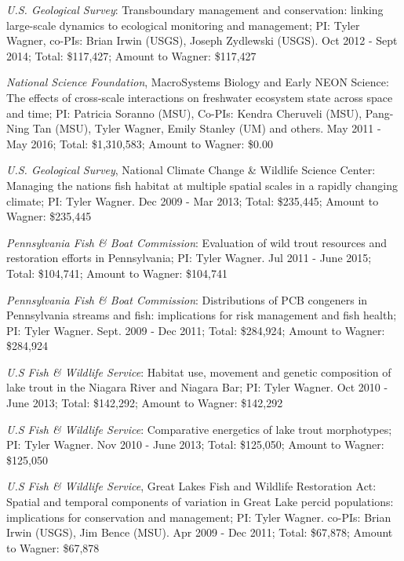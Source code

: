 \documentclass[10pt]{article}
\begin{document}
\begin{flushleft}
\begin{etaremune}
\item {\sl  U.S. Geological Survey}: Transboundary management and conservation: linking large-scale dynamics to ecological monitoring and management; PI: Tyler Wagner, co-PIs: Brian Irwin (USGS), Joseph Zydlewski (USGS). Oct 2012 - Sept 2014; Total: \$117,427; Amount to Wagner: \$117,427

\item {\sl National Science Foundation},  MacroSystems Biology and Early NEON Science: The effects of cross-scale interactions on freshwater ecosystem state across space and time; PI: Patricia Soranno (MSU), Co-PIs: Kendra Cheruveli (MSU), Pang-Ning Tan (MSU), Tyler Wagner, Emily Stanley (UM) and others. May 2011 - May 2016; Total: \$1,310,583;  Amount to Wagner: \$0.00

\item {\sl U.S. Geological Survey}, National Climate Change \& Wildlife Science Center: Managing the nations fish habitat at multiple spatial scales in a rapidly changing climate; PI: Tyler Wagner. Dec 2009 - Mar 2013; Total: \$235,445; Amount to Wagner: \$235,445

\item {\sl  Pennsylvania Fish \& Boat Commission}: Evaluation of wild trout resources and restoration efforts in Pennsylvania; PI: Tyler Wagner. Jul 2011 - June 2015; Total: \$104,741; Amount to Wagner: \$104,741

\item  {\sl  Pennsylvania Fish \& Boat Commission}: Distributions of PCB congeners in Pennsylvania streams and fish: implications for risk management and fish health; PI: Tyler Wagner. Sept. 2009 - Dec 2011; Total: \$284,924; Amount to Wagner: \$284,924

\item {\sl U.S Fish \& Wildlife Service}: Habitat use, movement and genetic composition of lake trout in the Niagara River and Niagara Bar; PI: Tyler Wagner. Oct 2010 - June 2013; Total: \$142,292;  Amount to Wagner: \$142,292

\item  {\sl U.S Fish \& Wildlife Service}: Comparative energetics of lake trout morphotypes; PI: Tyler Wagner. Nov 2010 - June 2013; Total: \$125,050; Amount to Wagner:  \$125,050

\item  {\sl U.S Fish \& Wildlife Service}, Great Lakes Fish and Wildlife Restoration Act: Spatial and temporal components of variation in Great Lake percid populations: implications for conservation and management; PI: Tyler Wagner. co-PIs: Brian Irwin (USGS), Jim Bence (MSU). Apr 2009 - Dec 2011; Total: \$67,878; Amount to Wagner: \$67,878
\end{etaremune}


\end{flushleft}
\end{document}
